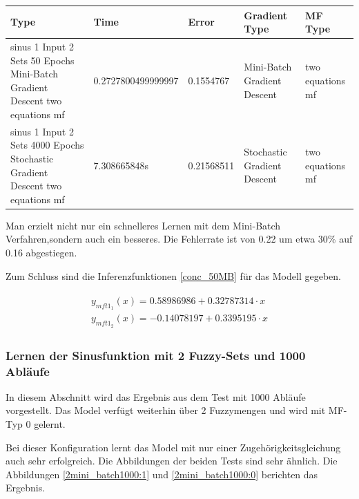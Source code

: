 {\begin{center}
	\begin{minipage}{\textwidth}
	\begin{tabular}{ | p{3cm} | l | l | p{3cm} | p{3cm} |}
		\hline
		Type & Time & Error & Gradient Type & MF Type \\ \hline
		sinus 1 Input 2 Sets 50 Epochs Mini-Batch Gradient Descent two equations mf&0.2727800499999997&0.1554767&Mini-Batch Gradient Descent&two equations mf\\ \hline
		sinus 1 Input 2 Sets 4000 Epochs Stochastic Gradient Descent two equations mf&7.308665848s&0.21568511&Stochastic Gradient Descent&two equations mf
		\\ \hline
	\end{tabular}  
\label{tab2_50MB}

\end{minipage}
\end{center}

Man erzielt nicht nur ein schnelleres Lernen mit dem Mini-Batch Verfahren,sondern auch ein besseres. Die Fehlerrate ist von 0.22 um etwa 30\% auf 0.16 abgestiegen.

Zum Schluss sind die Inferenzfunktionen \ref{conc_50MB} für das Modell gegeben.


\begin{align}
\begin{split}\label{conc_50MB}
	y_{mft1_1}(x) = 0.58986986 + 0.32787314\cdot x \\
	y_{mft1_2}(x) = -0.14078197 + 0.3395195\cdot x
\end{split}
\end{align}

\subsubsection{Lernen der Sinusfunktion mit 2 Fuzzy-Sets und 1000 Abläufe}\label{sinus_mb_2_1000}
In diesem Abschnitt wird das Ergebnis aus dem Test mit 1000 Abläufe vorgestellt. Das Model verfügt weiterhin über 2 Fuzzymengen und wird mit MF-Typ 0 gelernt. %

Bei dieser Konfiguration lernt das Model mit nur einer Zugehörigkeitsgleichung auch sehr erfolgreich. Die Abbildungen der beiden Tests sind sehr ähnlich. Die Abbildungen \ref{2mini_batch1000:1} und \ref{2mini_batch1000:0} berichten das Ergebnis.

}
